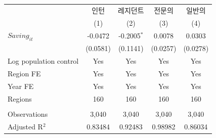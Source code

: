 \begingroup
\centering
\begin{tabular}{lcccc}
   \toprule
                          & 인턴     & 레지던트      & 전문의   & 일반의 \\   
                          & (1)      & (2)           & (3)      & (4)\\  
   \midrule 
   $Saving_{it}$          & -0.0472  & -0.2005$^{*}$ & 0.0078   & 0.0303\\   
                          & (0.0581) & (0.1141)      & (0.0257) & (0.0278)\\   
   Log population control & Yes      & Yes           & Yes      & Yes\\  
   Region FE              & Yes      & Yes           & Yes      & Yes\\  
   Year FE                & Yes      & Yes           & Yes      & Yes\\  
   Regions                & 160      & 160           & 160      & 160\\  
    \\
   Observations           & 3,040    & 3,040         & 3,040    & 3,040\\  
   Adjusted R$^2$         & 0.83484  & 0.92483       & 0.98982  & 0.86034\\  
   \bottomrule
\end{tabular}
\par\endgroup
